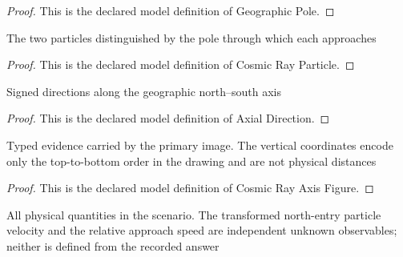 \begin{proof}
  This is the declared model definition of Geographic Pole.
\end{proof}
\begin{definition}
  \label{def:physics:phyx-mini-0591:phyxminiproblems-problemphyxmini0591-cosmicrayparticle}
  The two particles distinguished by the pole through which each approaches
\end{definition}
\begin{proof}
  This is the declared model definition of Cosmic Ray Particle.
\end{proof}
\begin{definition}
  \label{def:physics:phyx-mini-0591:phyxminiproblems-problemphyxmini0591-axialdirection}
  Signed directions along the geographic north--south axis
\end{definition}
\begin{proof}
  This is the declared model definition of Axial Direction.
\end{proof}
\begin{definition}
  \label{def:physics:phyx-mini-0591:phyxminiproblems-problemphyxmini0591-cosmicrayaxisfigure}
  Typed evidence carried by the primary image. The vertical coordinates encode only the top-to-bottom order in the drawing and are not physical distances
\end{definition}
\begin{proof}
  This is the declared model definition of Cosmic Ray Axis Figure.
\end{proof}
\begin{definition}
  \label{def:physics:phyx-mini-0591:phyxminiproblems-problemphyxmini0591-cosmicrayapproachsetup}
  All physical quantities in the scenario. The transformed north-entry particle velocity and the relative approach speed are independent unknown observables; neither is defined from the recorded answer
\end{definition}
